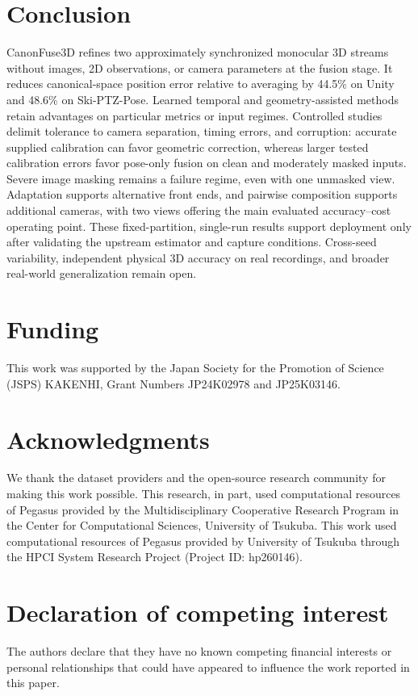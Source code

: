 \documentclass[preprint,12pt]{elsarticle}
\begin{document}
\section{Conclusion}
\label{sec:conclusion}

CanonFuse3D refines two approximately synchronized monocular 3D streams without images, 2D observations, or camera parameters at the fusion stage. It reduces canonical-space position error relative to averaging by 44.5\% on Unity and 48.6\% on Ski-PTZ-Pose. Learned temporal and geometry-assisted methods retain advantages on particular metrics or input regimes. Controlled studies delimit tolerance to camera separation, timing errors, and corruption: accurate supplied calibration can favor geometric correction, whereas larger tested calibration errors favor pose-only fusion on clean and moderately masked inputs. Severe image masking remains a failure regime, even with one unmasked view. Adaptation supports alternative front ends, and pairwise composition supports additional cameras, with two views offering the main evaluated accuracy--cost operating point. These fixed-partition, single-run results support deployment only after validating the upstream estimator and capture conditions. Cross-seed variability, independent physical 3D accuracy on real recordings, and broader real-world generalization remain open.

\section*{Funding}
This work was supported by the Japan Society for the Promotion of Science (JSPS) KAKENHI, Grant Numbers JP24K02978 and JP25K03146.

\section*{Acknowledgments}
We thank the dataset providers and the open-source research community for making this work possible. This research, in part, used computational resources of Pegasus provided by the Multidisciplinary Cooperative Research Program in the Center for Computational Sciences, University of Tsukuba. This work used computational resources of Pegasus provided by University of Tsukuba through the HPCI System Research Project (Project ID: hp260146).

\section*{Declaration of competing interest}
The authors declare that they have no known competing financial interests or personal relationships that could have appeared to influence the work reported in this paper.
\end{document}

